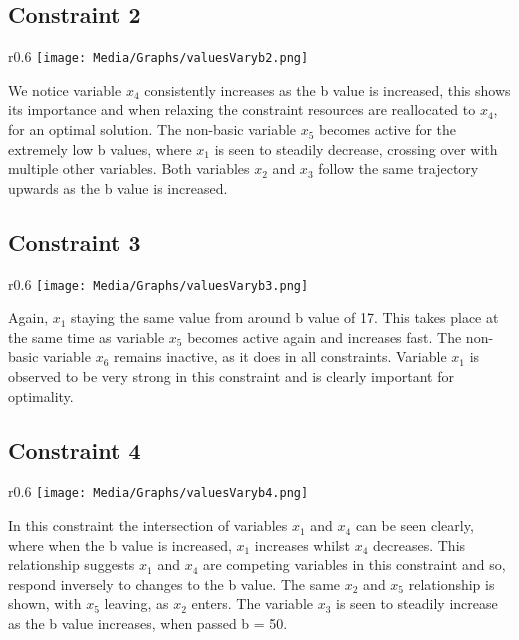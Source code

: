 \documentclass{article}
\numberwithin{equation}{section}
\begin{document}
\subsection{Constraint 2}
\begin{wrapfigure}{r}{0.6\textwidth}
    \centering
    \texttt{[image: Media/Graphs/valuesVaryb2.png]}
\end{wrapfigure}
We notice variable $x_4$ consistently increases as the b value is increased, this shows its importance and when relaxing the constraint resources are reallocated to $x_4$, for an optimal solution. The non-basic variable $x_5$ becomes active for the extremely low b values, where $x_1$ is seen to steadily decrease, crossing over with multiple other variables.  Both variables $x_2$ and $x_3$ follow the same trajectory upwards as the b value is increased. 
\subsection{Constraint 3}
\begin{wrapfigure}{r}{0.6\textwidth}
    \centering
    \texttt{[image: Media/Graphs/valuesVaryb3.png]}
\end{wrapfigure}
Again, $x_1$ staying the same value from around b value of 17. This takes place at the same time as variable $x_5$ becomes active again and increases fast. The non-basic variable $x_6$ remains inactive, as it does in all constraints. Variable $x_1$ is observed to be very strong in this constraint and is clearly important for optimality.
\subsection{Constraint 4}
\begin{wrapfigure}{r}{0.6\textwidth}
    \centering
    \texttt{[image: Media/Graphs/valuesVaryb4.png]}
\end{wrapfigure}
In this constraint the intersection of variables $x_1$ and $x_4$ can be seen clearly, where when the b value is increased, $x_1$ increases whilst $x_4$ decreases. This relationship suggests $x_1$ and $x_4$ are competing variables in this constraint and so, respond inversely to changes to the b value. The same $x_2$ and $x_5$ relationship is shown, with $x_5$ leaving, as $x_2$ enters. The variable $x_3$ is seen to steadily increase as the b value increases, when passed b = 50. 
\newpage
\end{document}
